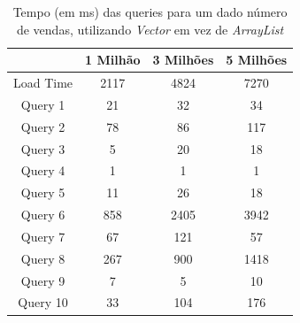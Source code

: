 \documentclass[a4paper]{report}
\begin{document}
\begin{table}[H]
    \begin{center}
        \begin{tabular}{| c | c | c | c |}
            \hline
            & 1 Milhão & 3 Milhões & 5 Milhões \\
            \hline
            Load Time & 2117 & 4824 & 7270 \\
            \hline
            Query 1 & 21 & 32 & 34 \\
            \hline
            Query 2 & 78 & 86 & 117 \\
            \hline
            Query 3 & 5 & 20 & 18 \\
            \hline
            Query 4 & 1 & 1 & 1 \\
            \hline
            Query 5 & 11 & 26 & 18 \\
            \hline
            Query 6 & 858 & 2405 & 3942 \\
            \hline
            Query 7 & 67 & 121 & 57 \\
            \hline
            Query 8 & 267 & 900 & 1418 \\
            \hline
            Query 9 & 7 & 5 & 10 \\
            \hline
            Query 10 & 33 & 104 & 176 \\
            \hline

        \end{tabular}
        \caption{Tempo (em ms) das queries para um dado número de vendas, utilizando
        \textit{Vector} em vez de \textit{ArrayList}}
        \label{tab:benchesLV}
    \end{center}
\end{table}
\end{document}
